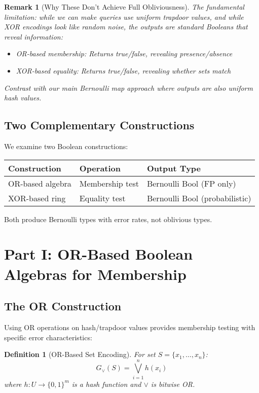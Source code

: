 \documentclass[11pt,final]{article}
\newcommand{\OR}{\lor}
\newtheorem{definition}[theorem]{Definition}
\newtheorem{remark}[theorem]{Remark}
\begin{document}
\begin{remark}[Why These Don't Achieve Full Obliviousness]
The fundamental limitation: while we can make queries use uniform trapdoor values, and while XOR encodings look like random noise, the outputs are standard Booleans that reveal information:
\begin{itemize}
    \item OR-based membership: Returns true/false, revealing presence/absence
    \item XOR-based equality: Returns true/false, revealing whether sets match
\end{itemize}
Contrast with our main Bernoulli map approach where outputs are also uniform hash values.
\end{remark}

\subsection{Two Complementary Constructions}

We examine two Boolean constructions:

\begin{center}
\begin{tabular}{lll}
\toprule
\textbf{Construction} & \textbf{Operation} & \textbf{Output Type} \\
\midrule
OR-based algebra & Membership test & Bernoulli Bool (FP only) \\
XOR-based ring & Equality test & Bernoulli Bool (probabilistic) \\
\bottomrule
\end{tabular}
\end{center}

Both produce Bernoulli types with error rates, not oblivious types.

\section{Part I: OR-Based Boolean Algebras for Membership}

\subsection{The OR Construction}

Using OR operations on hash/trapdoor values provides membership testing with specific error characteristics:

\begin{definition}[OR-Based Set Encoding]
For set $S = \{x_1, \ldots, x_n\}$:
\begin{equation}
G_{\OR}(S) = \bigvee_{i=1}^{n} h(x_i)
\end{equation}
where $h: U \to \{0,1\}^m$ is a hash function and $\vee$ is bitwise OR.
\end{definition}
\end{document}

